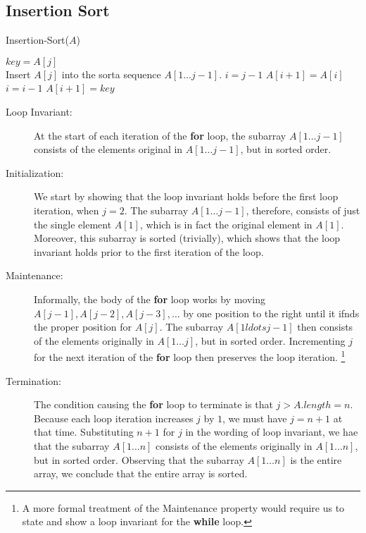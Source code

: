 \documentclass[12pt]{article}
\begin{document}
\begin{center}
    \section*{Insertion Sort}
\end{center}

\begin{algorithm}
    \caption{Insertion-Sort($A$)}
    \begin{algorithmic}
            \State $key = A[j]$ 
            \\ \Comment Insert $A[j]$ into the sorta sequence $A[1 \ldots j-1]$.
            \State $i = j-1$
                \State $A[i+1] = A[i]$
                \State $i = i - 1$
            \EndWhile
            \State $A[i+1] = key$
        \EndFor
    \end{algorithmic}
\end{algorithm}

\begin{description}
    \item[Loop Invariant:] At the start of each iteration of the \textbf{for} loop, the subarray $A[1 \ldots j-1 ]$ consists of the elements original in $A[1 \ldots j-1]$, but in sorted order.

    \item[Initialization:] We start by showing that the loop invariant holds before the first loop iteration, when $j=2$. The subarray $A[1 \ldots j-1]$, therefore, consists of just the single element $A[1]$, which is in fact the original element in $A[1]$. Moreover, this subarray is sorted (trivially), which shows that the loop invariant holds prior to the first iteration of the loop.

    \item[Maintenance:] Informally, the body of the \textbf{for} loop works by moving $A[j-1], A[j-2], A[j-3], \ldots$ by one position to the right until it ifnds the proper position for $A[j]$. The subarray $A[1 ldots j-1]$ then consists of the elements originally in $A[1 \ldots j]$, but in sorted order. Incrementing $j$ for the next iteration of the \textbf{for} loop then preserves the loop iteration.
    \footnote{A more formal treatment of the Maintenance property would require us to state and show a loop invariant for the \textbf{while} loop.}

    \item[Termination:] The condition causing the \textbf{for} loop to terminate is that $j > A.length = n$. Because each loop iteration increases $j$ by $1$, we must have $j = n + 1$ at that time. Substituting $n + 1$ for $j$ in the wording of loop invariant, we hae that the subarray $A[1 \ldots n]$ consists of the elements originally in $A[1 \ldots n]$,
    but in sorted order. Observing that the subarray $A[1 \ldots n]$ is the entire array, we conclude that the entire array is sorted.
\end{description}
\end{document}
